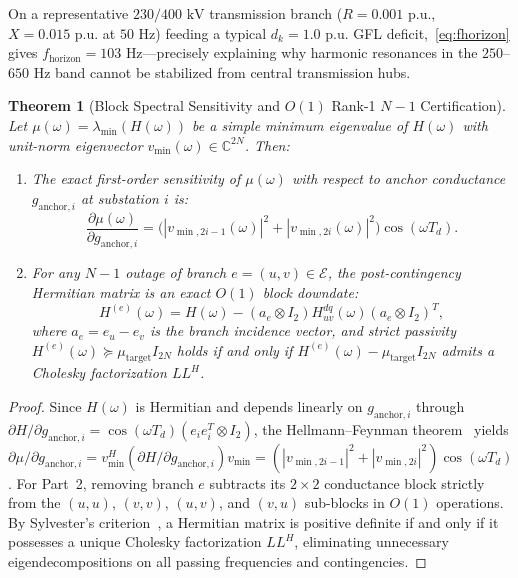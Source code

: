 \documentclass[10pt,twocolumn]{article}
\newtheorem{theorem}{Theorem}
\begin{document}
On a representative $230/400\text{ kV}$ transmission branch ($R=0.001\text{ p.u.}$, $X=0.015\text{ p.u.}$ at $50\text{ Hz}$) feeding a typical $d_k=1.0\text{ p.u.}$ GFL deficit,~\eqref{eq:fhorizon} gives $f_{\text{horizon}}=103\text{ Hz}$---precisely explaining why harmonic resonances in the $250$--$650\text{ Hz}$ band cannot be stabilized from central transmission hubs.

\begin{theorem}[Block Spectral Sensitivity and $O(1)$ Rank-1 $N-1$ Certification]
\label{thm:spectral}
Let $\mu(\omega)=\lambda_{\min}(H(\omega))$ be a simple minimum eigenvalue of $H(\omega)$ with unit-norm eigenvector $v_{\min}(\omega)\in\mathbb{C}^{2N}$. Then:
\begin{enumerate}[leftmargin=*,itemsep=2pt,topsep=2pt]
    \item The exact first-order sensitivity of $\mu(\omega)$ with respect to anchor conductance $g_{\text{anchor},i}$ at substation $i$ is:
    \begin{equation}
    \frac{\partial \mu(\omega)}{\partial g_{\text{anchor},i}} = \Big(|v_{\min,2i-1}(\omega)|^2 + |v_{\min,2i}(\omega)|^2\Big)\cos(\omega T_d).
    \label{eq:sens}
    \end{equation}
    \item For any $N-1$ outage of branch $e=(u,v)\in\mathcal{E}$, the post-contingency Hermitian matrix is an exact $O(1)$ block downdate:
    \begin{equation}
    H^{(e)}(\omega) = H(\omega) - (a_e \otimes I_2) H_{uv}^{dq}(\omega) (a_e \otimes I_2)^T,
    \label{eq:downdate}
    \end{equation}
    where $a_e = e_u - e_v$ is the branch incidence vector, and strict passivity $H^{(e)}(\omega)\succeq \mu_{\text{target}} I_{2N}$ holds if and only if $H^{(e)}(\omega)-\mu_{\text{target}} I_{2N}$ admits a Cholesky factorization $LL^H$.
\end{enumerate}
\end{theorem}

\begin{proof}
Since $H(\omega)$ is Hermitian and depends linearly on $g_{\text{anchor},i}$ through $\partial H/\partial g_{\text{anchor},i}=\cos(\omega T_d)(e_i e_i^T\otimes I_2)$, the Hellmann--Feynman theorem~\cite{horn2013matrix} yields $\partial\mu/\partial g_{\text{anchor},i}=v_{\min}^H(\partial H/\partial g_{\text{anchor},i})v_{\min}=(|v_{\min,2i-1}|^2+|v_{\min,2i}|^2)\cos(\omega T_d)$. For Part~2, removing branch $e$ subtracts its $2\times 2$ conductance block strictly from the $(u,u)$, $(v,v)$, $(u,v)$, and $(v,u)$ sub-blocks in $O(1)$ operations. By Sylvester's criterion~\cite{horn2013matrix}, a Hermitian matrix is positive definite if and only if it possesses a unique Cholesky factorization $LL^H$, eliminating unnecessary eigendecompositions on all passing frequencies and contingencies.
\end{proof}
\end{document}
